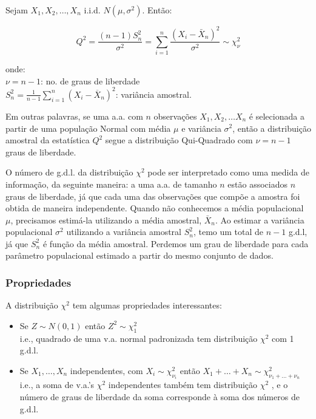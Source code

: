 \documentclass[
]{book}
\theoremstyle{definition}
\theoremstyle{definition}
\theoremstyle{definition}
\theoremstyle{remark}
\begin{document}
Sejam \(X_1, X_2, \ldots, X_n\) i.i.d. \(N(\mu, \sigma^2)\). Então:

\[Q^2 = \frac{(n-1)S_n^2}{\sigma^2} = \sum_{i=1}^{n}\frac{(X_i - \bar{X}_n)^2}{\sigma^2} \sim \chi^2_\nu\]

onde:\\
\(\nu = n-1\): no. de graus de liberdade\\
\(S_n^2 = \frac{1}{n-1} \sum_{i=1}^n (X_i - \overline{X}_n)^2\): variância amostral.

Em outras palavras, se uma a.a. com \(n\) observações \(X_1, X_2, \ldots X_n\) é selecionada a partir de uma população Normal com média \(\mu\) e variância \(\sigma^2\), então a distribuição amostral da estatística \(Q^2\) segue a distribuição Qui-Quadrado com \(\nu = n-1\) graus de liberdade.

O número de g.d.l. da distribuição \(\chi^2\) pode ser interpretado como uma medida de informação, da seguinte maneira: a uma a.a. de tamanho \(n\) estão associados \(n\) graus de liberdade, já que cada uma das observações que compõe a amostra foi obtida de maneira independente. Quando não conhecemos a média populacional \(\mu\), precisamos estimá-la utilizando a média amostral, \(\bar{X}_n\). Ao estimar a variância populacional \(\sigma^2\) utilizando a variância amostral \(S_n^2\), temo um total de \(n-1\) g.d.l, já que \(S_n^2\) é função da média amostral. Perdemos um grau de liberdade para cada parâmetro populacional estimado a partir do mesmo conjunto de dados.

\hypertarget{propriedades-4}{%
\subsubsection*{Propriedades}\label{propriedades-4}}

A distribuição \(\chi^2\) tem algumas propriedades interessantes:

\begin{itemize}
\item
  Se \(Z \sim N(0,1)\) então \(Z^2 \sim \chi^2_1\)\\
  i.e., quadrado de uma v.a. normal padronizada tem distribuição \(\chi^2\) com 1 g.d.l.
\item
  Se \(X_1, \ldots, X_n\) independentes, com \(X_i \sim \chi^2_{\nu_i}\) então \(X_1 + \ldots + X_n \sim \chi^2_{\nu_1 + \ldots + \nu_n}\)\\
  i.e., a soma de v.a.'s \(\chi^2\) independentes também tem distribuição \(\chi^2\) , e o número de graus de liberdade da soma corresponde à soma dos números de g.d.l.
\end{itemize}
\end{document}
